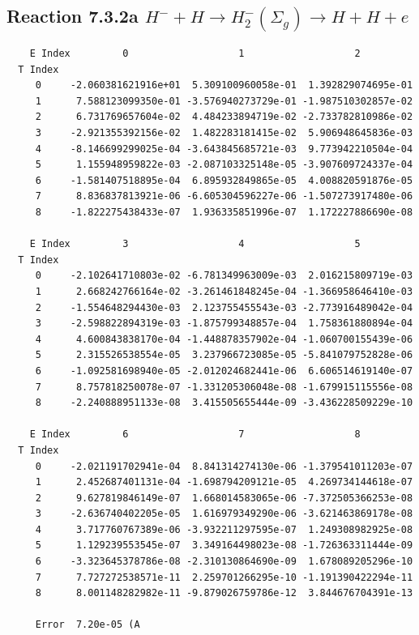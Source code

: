 \documentclass[12pt,dvipdfmx]{article}
\begin{document}
\newpage
\subsection{
Reaction 7.3.2a $  H^- + H \rightarrow H_2^-(\Sigma_g) \rightarrow H + H + e$}


\begin{small}\begin{verbatim}
    E Index         0                   1                   2
  T Index
     0     -2.060381621916e+01  5.309100960058e-01  1.392829074695e-01
     1      7.588123099350e-01 -3.576940273729e-01 -1.987510302857e-02
     2      6.731769657604e-02  4.484233894719e-02 -2.733782810986e-02
     3     -2.921355392156e-02  1.482283181415e-02  5.906948645836e-03
     4     -8.146699299025e-04 -3.643845685721e-03  9.773942210504e-04
     5      1.155948959822e-03 -2.087103325148e-05 -3.907609724337e-04
     6     -1.581407518895e-04  6.895932849865e-05  4.008820591876e-05
     7      8.836837813921e-06 -6.605304596227e-06 -1.507273917480e-06
     8     -1.822275438433e-07  1.936335851996e-07  1.172227886690e-08

    E Index         3                   4                   5
  T Index
     0     -2.102641710803e-02 -6.781349963009e-03  2.016215809719e-03
     1      2.668242766164e-02 -3.261461848245e-04 -1.366958646410e-03
     2     -1.554648294430e-03  2.123755455543e-03 -2.773916489042e-04
     3     -2.598822894319e-03 -1.875799348857e-04  1.758361880894e-04
     4      4.600843838170e-04 -1.448878357902e-04 -1.060700155439e-06
     5      2.315526538554e-05  3.237966723085e-05 -5.841079752828e-06
     6     -1.092581698940e-05 -2.012024682441e-06  6.606514619140e-07
     7      8.757818250078e-07 -1.331205306048e-08 -1.679915115556e-08
     8     -2.240888951133e-08  3.415505655444e-09 -3.436228509229e-10

    E Index         6                   7                   8
  T Index
     0     -2.021191702941e-04  8.841314274130e-06 -1.379541011203e-07
     1      2.452687401131e-04 -1.698794209121e-05  4.269734144618e-07
     2      9.627819846149e-07  1.668014583065e-06 -7.372505366253e-08
     3     -2.636740402205e-05  1.616979349290e-06 -3.621463869178e-08
     4      3.717760767389e-06 -3.932211297595e-07  1.249308982925e-08
     5      1.129239553545e-07  3.349164498023e-08 -1.726363311444e-09
     6     -3.323645378786e-08 -2.310130864690e-09  1.678089205296e-10
     7      7.727272538571e-11  2.259701266295e-10 -1.191390422294e-11
     8      8.001148282982e-11 -9.879026759786e-12  3.844676704391e-13

     Error  7.20e-05 (A
\end{verbatim}\end{small}
\end{document}
